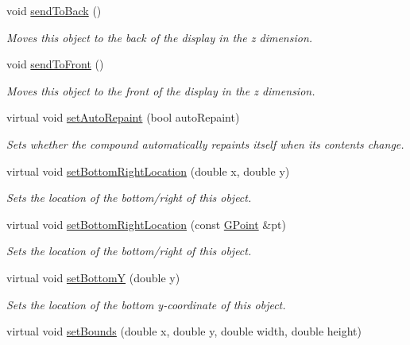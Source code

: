 \begin{DoxyCompactItemize}
void \mbox{\hyperlink{classGObject_a0f7f1efbb7fd46dde2867c4ad0330896}{send\+To\+Back}} ()
\begin{DoxyCompactList}\small\item\em Moves this object to the back of the display in the {\itshape z} dimension. \end{DoxyCompactList}\item 
void \mbox{\hyperlink{classGObject_aee33d68488e46827ef55fac07f40a9b2}{send\+To\+Front}} ()
\begin{DoxyCompactList}\small\item\em Moves this object to the front of the display in the {\itshape z} dimension. \end{DoxyCompactList}\item 
virtual void \mbox{\hyperlink{classGCompound_adf10848319457bd6df4c657bf8872bee}{set\+Auto\+Repaint}} (bool auto\+Repaint)
\begin{DoxyCompactList}\small\item\em Sets whether the compound automatically repaints itself when its contents change. \end{DoxyCompactList}\item 
virtual void \mbox{\hyperlink{classGObject_a71ff7b16b8f1bdc4a1ce9f30cf8b87d8}{set\+Bottom\+Right\+Location}} (double x, double y)
\begin{DoxyCompactList}\small\item\em Sets the location of the bottom/right of this object. \end{DoxyCompactList}\item 
virtual void \mbox{\hyperlink{classGObject_ac6f7320321182f1d18c1c0fa97d5e941}{set\+Bottom\+Right\+Location}} (const \mbox{\hyperlink{classGPoint}{G\+Point}} \&pt)
\begin{DoxyCompactList}\small\item\em Sets the location of the bottom/right of this object. \end{DoxyCompactList}\item 
virtual void \mbox{\hyperlink{classGObject_a4b20e93c2a2597484f74ee5caa71f41f}{set\+BottomY}} (double y)
\begin{DoxyCompactList}\small\item\em Sets the location of the bottom y-\/coordinate of this object. \end{DoxyCompactList}\item 
virtual void \mbox{\hyperlink{classGObject_a2aae8197624b72265ab83b4f1bc73f2f}{set\+Bounds}} (double x, double y, double width, double height)

\end{DoxyCompactItemize}
